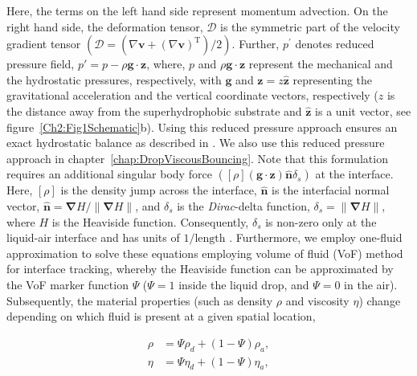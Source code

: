 \begin{subappendices}
	\noindent Here, the terms on the left hand side represent momentum advection. On the right hand side, the deformation tensor, $\boldsymbol{\mathcal{D}}$ is the symmetric part of the velocity gradient tensor $\left(\boldsymbol{\mathcal{D}} = \left(\nabla\boldsymbol{v} + \left(\nabla\boldsymbol{v}\right)^{\text{T}}\right)/2\right)$. Further, $p^{\prime}$ denotes reduced pressure field, $p' = p - \rho\boldsymbol{g}\cdot\boldsymbol{z}$, where, $p$ and $\rho\boldsymbol{g}\cdot\boldsymbol{z}$ represent the mechanical and the hydrostatic pressures, respectively, with $\boldsymbol{g}$ and $\boldsymbol{z} = z\boldsymbol{\hat{z}}$ representing the gravitational acceleration and the vertical coordinate vectors, respectively ($z$ is the distance away from the superhydrophobic substrate and $\boldsymbol{\hat{z}}$ is a unit vector, see figure~\ref{Ch2:Fig1Schematic}b). Using this reduced pressure approach ensures an exact hydrostatic balance as described in \citet{popinet2018numerical, basiliskpopinet3}. We also use this reduced pressure approach in chapter~\ref{chap:DropViscousBouncing}. Note that this formulation requires an additional singular body force $\left([\rho]\left(\boldsymbol{g}\cdot\boldsymbol{z}\right)\boldsymbol{\hat{n}}\delta_s\right)$ at the interface. Here, $[\rho]$ is the density jump across the interface, $\boldsymbol{\hat{n}}$ is the interfacial normal vector, $\boldsymbol{\hat{n}} = \boldsymbol{\nabla}H/\|\boldsymbol{\nabla}H\|$, and $\delta_s$ is the \emph{Dirac}-delta function, $\delta_s = \|\boldsymbol{\nabla}H\|$, where $H$ is the Heaviside function. Consequently, $\delta_s$ is non-zero only at the liquid-air interface and has units of $1/\text{length}$ \citet[for detailed derivation, see appendix B of][]{tryggvason2011direct}. Furthermore, we employ one-fluid approximation \cite{prosperetti2009computational, tryggvason2011direct} to solve these equations employing volume of fluid (VoF) method for interface tracking, whereby the Heaviside function can be approximated by the VoF marker function $\Psi$ ($\Psi = 1$ inside the liquid drop, and $\Psi = 0$ in the air). Subsequently, the material properties (such as density $\rho$ and viscosity $\eta$) change depending on which fluid is present at a given spatial location,
	
	\begin{align}
		\label{Ch2::Eqn::density}
		\rho &= \Psi\rho_d + \left(1-\Psi\right)\rho_{a},\\
		\label{Ch2::Eqn::Oh}
		\eta &= \Psi\eta_d + \left(1-\Psi\right)\eta_{a},
	\end{align}


\end{subappendices}
